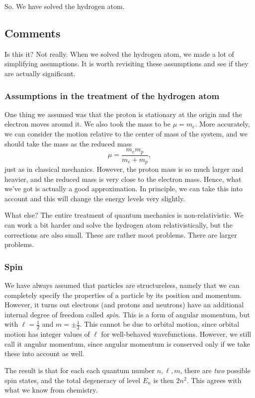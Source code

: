 \documentclass[a4paper]{article}
\begin{document}
So. We have solved the hydrogen atom.
\subsection{Comments}
Is this it? Not really. When we solved the hydrogen atom, we made a lot of simplifying assumptions. It is worth revisiting these assumptions and see if they are actually significant.

\subsubsection*{Assumptions in the treatment of the hydrogen atom}
One thing we assumed was that the proton is stationary at the origin and the electron moves around it. We also took the mass to be $\mu = m_e$. More accurately, we can consider the motion relative to the center of mass of the system, and we should take the mass as the reduced mass
\[
  \mu = \frac{m_e m_p}{m_e + m_p},
\]
just as in classical mechanics. However, the proton mass is so much larger and heavier, and the reduced mass is very close to the electron mass. Hence, what we've got is actually a good approximation. In principle, we can take this into account and this will change the energy levels very slightly.

What else? The entire treatment of quantum mechanics is non-relativistic. We can work a bit harder and solve the hydrogen atom relativistically, but the corrections are also small. These are rather moot problems. There are larger problems.

\subsubsection*{Spin}
We have always assumed that particles are structureless, namely that we can completely specify the properties of a particle by its position and momentum. However, it turns out electrons (and protons and neutrons) have an additional internal degree of freedom called \emph{spin}. This is a form of angular momentum, but with $\ell = \frac{1}{2}$ and $m = \pm \frac{1}{2}$. This cannot be due to orbital motion, since orbital motion has integer values of $\ell$ for well-behaved wavefunctions. However, we still call it angular momentum, since angular momentum is conserved only if we take these into account as well.

The result is that for each each quantum number $n, \ell, m$, there are \emph{two} possible spin states, and the total degeneracy of level $E_n$ is then $2n^2$. This agrees with what we know from chemistry.
\end{document}
